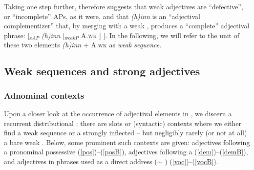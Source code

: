 \documentclass[output=paper,colorlinks,citecolor=brown]{langscibook}
\begin{document}
Taking \citet{BorjarsPayne2016} one step further,  \citet{Pfaff2019} therefore suggests  that weak adjectives are ``defective'', or ``incomplete'' APs, as it were, and that \textit{(h)inn} is an ``adjectival complementizer'' that, by merging with a weak , produces a ``complete'' adjectival phrase:  [$_{xAP}$ \textit{(h)inn} [$_{weakP}$ A.\textsc{wk} ] ]. In the following, we will refer to the unit of these two elements \textit{(h)inn} + A.\textsc{wk} as \textit{weak sequence}.






\subsection{Weak sequences and strong adjectives}


\subsubsection{Adnominal contexts}
\label{sec:9:ADN}

Upon a closer look at the occurrence of adjectival elements in , we discern a recurrent distributional : there are slots or (syntactic) contexts where we either find a weak sequence or a strongly inflected  -- but negligibly rarely (or not at all) a bare weak . Below, some prominent such contexts are given: adjectives following a  pronominal possessive (\ref{pos})--(\ref{posB}), adjectives following a  (\ref{dem})--(\ref{demB}),  and adjectives in  phrases used as a direct address ($\sim$ ) (\ref{voc})--(\ref{vocB}).
\end{document}
